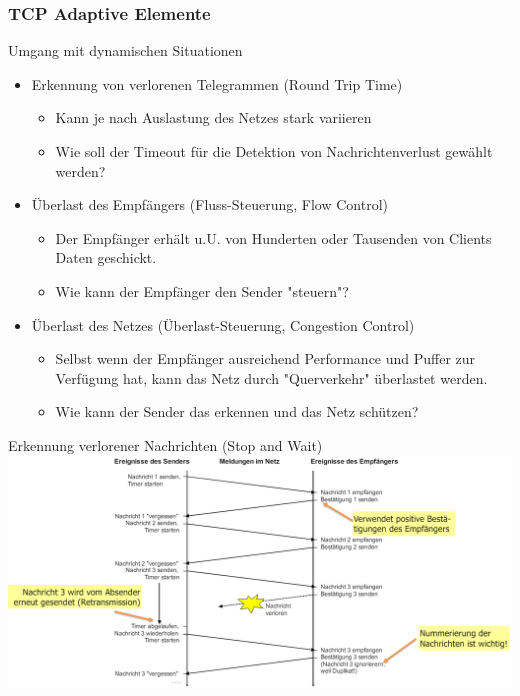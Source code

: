 \subsubsection{TCP Adaptive Elemente}

\begin{definition}{Umgang mit dynamischen Situationen}
    \begin{itemize}
        \item Erkennung von verlorenen Telegrammen (Round Trip Time)
        \begin{itemize}
            \item Kann je nach Auslastung des Netzes stark variieren
            \item Wie soll der Timeout für die Detektion von Nachrichtenverlust gewählt werden?
        \end{itemize}
        \item Überlast des Empfängers (Fluss-Steuerung, Flow Control)
        \begin{itemize}
            \item Der Empfänger erhält u.U. von Hunderten oder Tausenden von Clients Daten geschickt.
            \item Wie kann der Empfänger den Sender "steuern"?
        \end{itemize}
        \item Überlast des Netzes (Überlast-Steuerung, Congestion Control)
        \begin{itemize}
            \item Selbst wenn der Empfänger ausreichend Performance und Puffer zur Verfügung hat, kann das Netz durch "Querverkehr" überlastet werden.
            \item Wie kann der Sender das erkennen und das Netz schützen?
        \end{itemize}
    \end{itemize}
\end{definition}

\begin{concept}{Erkennung verlorener Nachrichten (Stop and Wait)}\\
    \includegraphics[width=1\linewidth]{images/erkennung_verlorener_nachrichten.png}   
\end{concept}

